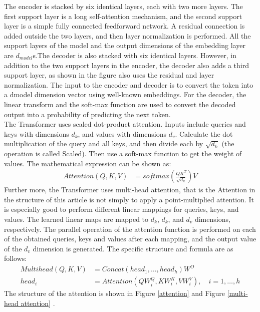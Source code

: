 \documentclass{article}
\begin{document}
The encoder is stacked by six identical layers, each with two more layers. The first support layer is a long self-attention mechanism, and the second support layer is a simple fully connected feedforward network. A residual connection is added outside the two layers, and then layer normalization is performed. All the support layers of the model and the output dimensions of the embedding layer are $d_{model}$s.The decoder is also stacked with six identical layers. However, in addition to the two support layers in the encoder, the decoder also adds a third support layer, as shown in the figure also uses the residual and layer normalization. The input to the encoder and decoder is to convert the token into a dmodel dimension vector using well-known embeddings. For the decoder, the linear transform and the soft-max function are used to convert the decoded output into a probability of predicting the next token.\\
The Transformer uses scaled dot-product attention. Inputs include queries and keys with dimensions $d_{k}$, and values with dimensions $d_{v}$. Calculate the dot multiplication of the query and all keys, and then divide each by $\sqrt{d_{k}}$ (the operation is called Scaled). Then use a soft-max function to get the weight of values. The mathematical expression can be shown as:
\begin{align}
\label{attention}
Attention(Q,K,V)&=softmax(\frac{QK^T}{\sqrt{d_k}})V
\end{align}
Further more, the Transformer uses multi-head attention, that is the Attention in the structure of this article is not simply to apply a point-multiplied attention. It is especially good to perform different linear mappings for queries, keys, and values. The learned linear maps are mapped to $d_{k}$, $d_{k}$, and $d_{v}$ dimensions, respectively. The parallel operation of the attention function is performed on each of the obtained queries, keys and values after each mapping, and the output value of the $d_{v}$ dimension is generated. The specific structure and formula are as follows:
\begin{align}
Multihead(Q,K,V)&=Concat(head_1,\dots,head_h)W^O\\
\label{multihead}
head_i&=Attention(QW_i^Q,KW_i^K,VW_i^V),\quad i=1,\dots,h
\end{align}
The structure of the attention is shown in Figure \ref{attention} and Figure \ref{multi-head attention} .\\
\end{document}
